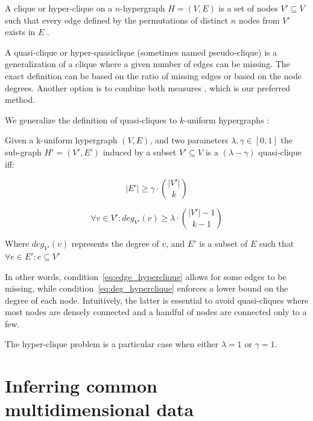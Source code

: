 A clique or hyper-clique on a $n$-hypergraph $H = (V, E)$ is a set of nodes
$V' \subseteq V$ such that
every edge defined by the permutations of distinct $n$ nodes from $V'$ exists in $E$
\cite{koeller2003discovery}.

A quasi-clique or hyper-quasiclique (sometimes named pseudo-clique) is a generalization of a clique
where a given number of edges can be missing. The exact definition can be based
on the ratio of missing edges or based on the node degrees. Another option
is to combine both measures \cite{brunato2007effectively}, which is our preferred method.

We generalize the definition of quasi-cliques to $k$-uniform hypergraphs :

\begin{definition}
    \label{def:quasi_clique}
    Given a k-uniform hypergraph $(V,E)$, and two parameters $\lambda, \gamma \in [0,1]$
    the sub-graph $H'=(V',E')$ induced by a subset $V' \subseteq V$ is a
    $(\lambda-\gamma)$ quasi-clique iff:
    
    \begin{equation}
        |E'| \ge \gamma \cdot \binom{|V'|}{k}
        \label{eq:edge_hyperclique}
    \end{equation}
    
    \begin{equation}
        \forall v \in V': deg_{V'}(v) \ge \lambda \cdot \binom{|V'| - 1}{k - 1}
        \label{eq:deg_hyperclique}
    \end{equation}
    
    Where $deg_{V'}(v)$ represents the degree of $v$, and $E'$ is a subset of $E$ such that
    $\forall e \in E' : e \subseteq V'$
\end{definition}

In other words, condition~\ref{eq:edge_hyperclique} allows for some edges to be missing,
while condition~\ref{eq:deg_hyperclique} enforces a lower bound on the degree of each
node. Intuitively, the latter is essential to avoid quasi-cliques where most nodes
are densely connected and a handful of nodes are connected only to a few.

The hyper-clique problem is a particular case when either $\lambda = 1$ or $\gamma = 1$.



\section{Inferring common multidimensional data}
\label{sec:inferring}

